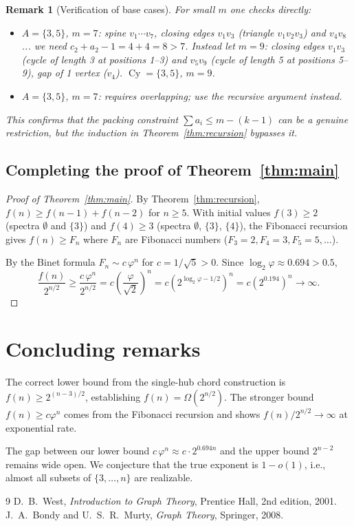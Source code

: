 \documentclass[11pt]{amsart}
\newtheorem{remark}[theorem]{Remark}
\DeclareMathOperator{\Cy}{Cy}
\begin{document}
\begin{remark}[Verification of base cases]\label{rem:base}
For small $m$ one checks directly:
\begin{itemize}
  \item $A=\{3,5\}$, $m=7$: spine $v_1\cdots v_7$, closing edges $v_1v_3$ (triangle
    $v_1v_2v_3$) and $v_4v_8$... we need $c_2+a_2-1=4+4=8>7$.  Instead let $m=9$:
    closing edges $v_1v_3$ (cycle of length 3 at positions 1--3) and $v_5v_9$ (cycle
    of length 5 at positions 5--9), gap of 1 vertex ($v_4$).  $\Cy=\{3,5\}$, $m=9$. \checkmark
  \item $A=\{3,5\}$, $m=7$: requires overlapping; use the recursive argument instead.
\end{itemize}
This confirms that the packing constraint $\sum a_i\le m-(k-1)$ can be a genuine
restriction, but the induction in Theorem~\ref{thm:recursion} bypasses it.
\end{remark}

\subsection{Completing the proof of Theorem~\ref{thm:main}}

\begin{proof}[Proof of Theorem~\ref{thm:main}]
By Theorem~\ref{thm:recursion}, $f(n)\ge f(n-1)+f(n-2)$ for $n\ge 5$.  With initial
values $f(3)\ge 2$ (spectra $\emptyset$ and $\{3\}$) and $f(4)\ge 3$ (spectra
$\emptyset$, $\{3\}$, $\{4\}$), the Fibonacci recursion gives $f(n)\ge F_n$ where
$F_n$ are Fibonacci numbers ($F_3=2, F_4=3, F_5=5, \ldots$).

By the Binet formula $F_n\sim c\,\varphi^n$ for $c=1/\sqrt{5}>0$.  Since
$\log_2\varphi\approx 0.694>0.5$,
\[
  \frac{f(n)}{2^{n/2}}\ge\frac{c\,\varphi^n}{2^{n/2}}
  = c\left(\frac{\varphi}{\sqrt{2}}\right)^n
  = c\left(2^{\log_2\varphi-1/2}\right)^n
  = c\left(2^{0.194}\right)^n \longrightarrow \infty.
\]
\end{proof}

\section{Concluding remarks}

The correct lower bound from the single-hub chord construction is
$f(n)\ge 2^{(n-3)/2}$, establishing $f(n)=\Omega(2^{n/2})$.  The stronger bound
$f(n)\ge c\varphi^n$ comes from the Fibonacci recursion and shows
$f(n)/2^{n/2}\to\infty$ at exponential rate.

The gap between our lower bound $c\,\varphi^n\approx c\cdot 2^{0.694n}$ and the
upper bound $2^{n-2}$ remains wide open.  We conjecture that the true exponent is
$1-o(1)$, i.e., almost all subsets of $\{3,\ldots,n\}$ are realizable.

\begin{thebibliography}{9}
 D.~B.~West, \emph{Introduction to Graph Theory}, Prentice Hall,
2nd edition, 2001.
 J.~A.~Bondy and U.~S.~R.~Murty, \emph{Graph Theory},
Springer, 2008.
\end{thebibliography}
\end{document}
